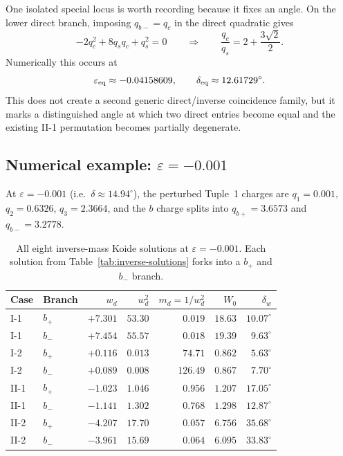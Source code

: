 \documentclass[11pt]{article}
\begin{document}
One isolated special locus is worth recording because it fixes an angle.
On the lower direct branch, imposing $q_{b-}=q_c$ in the direct quadratic
gives
\[
  -2q_c^2 + 8q_s q_c + q_s^2 = 0
  \qquad\Longrightarrow\qquad
  \frac{q_c}{q_s} = 2 + \frac{3\sqrt2}{2}.
\]
Numerically this occurs at
\[
  \varepsilon_{\rm eq} \approx -0.04158609,
  \qquad
  \delta_{\rm eq} \approx 12.61729^\circ.
\]
This does not create a second generic direct/inverse coincidence family, but
it marks a distinguished angle at which two direct entries become equal and
the existing II-1 permutation becomes partially degenerate.

\subsection{Numerical example: $\varepsilon = -0.001$}

At $\varepsilon = -0.001$ (i.e.\ $\delta \approx 14.94^\circ$),
the perturbed Tuple~1 charges are
$q_1 = 0.001$, $q_2 = 0.6326$, $q_3 = 2.3664$,
and the $b$ charge splits into $q_{b+} = 3.6573$ and $q_{b-} = 3.2778$.

\begin{table}[h]
\centering
\small
\begin{tabular}{@{}l l r r r r r@{}}
\toprule
Case & Branch & $w_d$ & $w_d^2$ & $m_d = 1/w_d^2$ & $W_0$ & $\delta_w$ \\
\midrule
I-1  & $b_+$ & $+7.301$ & $53.30$ & $0.019$ & $18.63$ & $10.07^\circ$ \\
I-1  & $b_-$ & $+7.454$ & $55.57$ & $0.018$ & $19.39$ & $9.63^\circ$ \\[3pt]
I-2  & $b_+$ & $+0.116$ & $0.013$ & $74.71$ & $0.862$ & $5.63^\circ$ \\
I-2  & $b_-$ & $+0.089$ & $0.008$ & $126.49$ & $0.867$ & $7.70^\circ$ \\[3pt]
II-1 & $b_+$ & $-1.023$ & $1.046$ & $0.956$ & $1.207$ & $17.05^\circ$ \\
II-1 & $b_-$ & $-1.141$ & $1.302$ & $0.768$ & $1.298$ & $12.87^\circ$ \\[3pt]
II-2 & $b_+$ & $-4.207$ & $17.70$ & $0.057$ & $6.756$ & $35.68^\circ$ \\
II-2 & $b_-$ & $-3.961$ & $15.69$ & $0.064$ & $6.095$ & $33.83^\circ$ \\
\bottomrule
\end{tabular}
\caption{All eight inverse-mass Koide solutions at $\varepsilon=-0.001$.
  Each solution from Table~\ref{tab:inverse-solutions} forks into a $b_+$
  and $b_-$ branch.}
\label{tab:inverse-perturbed}
\end{table}
\end{document}
